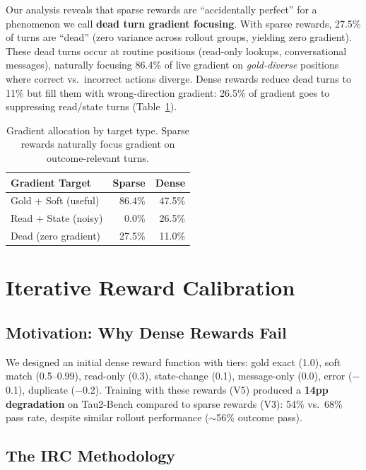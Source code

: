 \documentclass[11pt]{article}
\newcommand{\irc}{\textsc{IRC}}
\begin{document}
Our analysis reveals that sparse rewards are ``accidentally perfect'' for a phenomenon we call \textbf{dead turn gradient focusing}. With sparse rewards, 27.5\% of turns are ``dead'' (zero variance across rollout groups, yielding zero gradient). These dead turns occur at routine positions (read-only lookups, conversational messages), naturally focusing 86.4\% of live gradient on \emph{gold-diverse} positions where correct vs.\ incorrect actions diverge. Dense rewards reduce dead turns to 11\% but fill them with wrong-direction gradient: 26.5\% of gradient goes to suppressing read/state turns (Table~\ref{tab:gradient_alloc}).

\begin{table}[t]
\centering
\small
\begin{tabular}{lrr}
\toprule
\textbf{Gradient Target} & \textbf{Sparse} & \textbf{Dense} \\
\midrule
Gold + Soft (useful) & 86.4\% & 47.5\% \\
Read + State (noisy) & 0.0\% & 26.5\% \\
Dead (zero gradient) & 27.5\% & 11.0\% \\
\bottomrule
\end{tabular}
\caption{Gradient allocation by target type. Sparse rewards naturally focus gradient on outcome-relevant turns.}
\label{tab:gradient_alloc}
\end{table}

\section{Iterative Reward Calibration}
\label{sec:irc}

\subsection{Motivation: Why Dense Rewards Fail}

We designed an initial dense reward function with tiers: gold exact (1.0), soft match (0.5--0.99), read-only (0.3), state-change (0.1), message-only (0.0), error ($-$0.1), duplicate ($-$0.2). Training with these rewards (V5) produced a \textbf{14pp degradation} on Tau2-Bench compared to sparse rewards (V3): 54\% vs.\ 68\% pass rate, despite similar rollout performance ($\sim$56\% outcome pass).

\subsection{The \irc{} Methodology}
\end{document}
